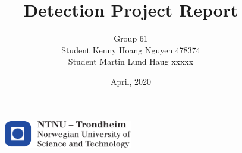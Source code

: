 \documentclass[11pt, a4paper, USenglish]{article} %
\begin{document}
\title{Detection Project Report}
\author{Group 61\\Student Kenny Hoang Nguyen 478374\\Student Martin Lund Haug xxxxx\\}
\date{April, 2020}
\begin{titlepage}
    \maketitle
    \begin{figure}
    \centering
    \includegraphics[width=0.5\textwidth]{figures/logontnu_eng.pdf}\\
    \end{figure}
    \thispagestyle{empty}
\end{titlepage}

\newpage

\thispagestyle{empty} %

\newpage
\tableofcontents
\thispagestyle{empty} %

\newpage
\setcounter{page}{1}







\newpage
{}
\printbibliography{}
\label{sec:bibliography}


\end{document}
